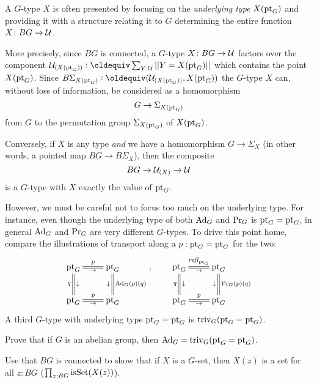\begin{remark}
  \label{remark:GsetsareGsets}
  A $G$-type $X$ is often presented by focusing on the \emph{underlying type} $X({\mathord{\mathrm{pt}}}_G)$  and providing it with a structure relating it to $G$ determining the entire function $X\colon BG\to\mathcal{U}$.

More precisely, since $BG$ is connected, a $G$-type $X\colon BG\to\mathcal{U}$ factors over the component $\UU_{(X(\pt_G))}\defequi\sum_{Y:\UU}||Y=X(\pt_G)||$ which contains the point $X({\mathord{\mathrm{pt}}}_G)$.  Since $B\Sigma_{X(\pt_G)}\defequi(\UU_{(X(\pt_G))},X(\pt_G))$ the $G$-type $X$ can, without loss of information, be considered as a homomorphism 
$$G\to\Sigma_{X(\pt_G)}%
$$ from $G$ to the permutation group $\Sigma_{X({\mathord{\mathrm{pt}}}_G)}$ of $X({\mathord{\mathrm{pt}}}_G)$.

Conversely, if $X$ is any type \emph{and} we have a homomorphism $G\to\Sigma_X$ (in other words, a pointed map $BG\to B\Sigma_{X}%
$), then the composite
$$BG\to \mathcal{U}_{(X)}\to \mathcal{U}$$
is a $G$-type with $X$ exactly the value of ${\mathord{\mathrm{pt}}}_G$.

However, we must be careful not to focus too much on the underlying type.  
For instance, even though the underlying type of both $\mathrm{Ad}_G$ and $\mathrm{Pr}_{{G}}$ is ${\mathord{\mathrm{pt}}}_G={\mathord{\mathrm{pt}}}_G$, in general  $\mathrm{Ad}_G$ and $\mathrm{Pr}_{{G}}$  are very different $G$-types.  
To drive this point home, compare the illustrations of transport along a $p:{\mathord{\mathrm{pt}}}_G={\mathord{\mathrm{pt}}}_G$ for the two:
$$\xymatrix{\pt_G\ar@{=}[r]^p_\to\ar@{=}[d]_q^\downarrow&\pt_G\ar@{=}[d]^{\Ad_G(p)(q)}_\downarrow\\
\pt_G\ar@{=}[r]^p_\to&\pt_G},\qquad
\xymatrix{\pt_G\ar@{=}[r]^{\refl{\pt_G}}_\to\ar@{=}[d]_q^\downarrow&\pt_G\ar@{=}[d]^{\princ G(p)(q)}_\downarrow\\
\pt_G\ar@{=}[r]^p_\to&\pt_G}$$
A third $G$-type with underlying type ${\mathord{\mathrm{pt}}}_G={\mathord{\mathrm{pt}}}_G$ is $\mathrm{triv}_G({\mathord{\mathrm{pt}}}_G={\mathord{\mathrm{pt}}}_G)$.
\end{remark}

\begin{xca}
  Prove that if $G$ is an abelian group, then $\mathrm{Ad}_G=\mathrm{triv}_G({\mathord{\mathrm{pt}}}_G={\mathord{\mathrm{pt}}}_G)$.
\end{xca}
\begin{xca}
  Use that $BG$ is connected to show that if $X$ is a $G$-set, then $X(z)$ is a set for all $z:BG$ (\ie $\prod_{z:BG}\mathrm{isSet}(X(z))$).
\end{xca}
